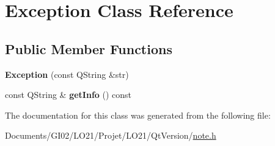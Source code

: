 \hypertarget{class_exception}{}\section{Exception Class Reference}
\label{class_exception}
\subsection*{Public Member Functions}
\begin{DoxyCompactItemize}
\item 
\mbox{\label{class_exception_a72d06f00500f1b551adadd188a1e1f33}} 
{\bfseries Exception} (const Q\+String \&str)
\item 
\mbox{\label{class_exception_a378568dd6f6421f43d323db53c2e5fe7}} 
const Q\+String \& {\bfseries get\+Info} () const
\end{DoxyCompactItemize}


The documentation for this class was generated from the following file\+:\begin{DoxyCompactItemize}
\item 
Documents/\+G\+I02/\+L\+O21/\+Projet/\+L\+O21/\+Qt\+Version/\hyperlink{note_8h}{note.\+h}\end{DoxyCompactItemize}

